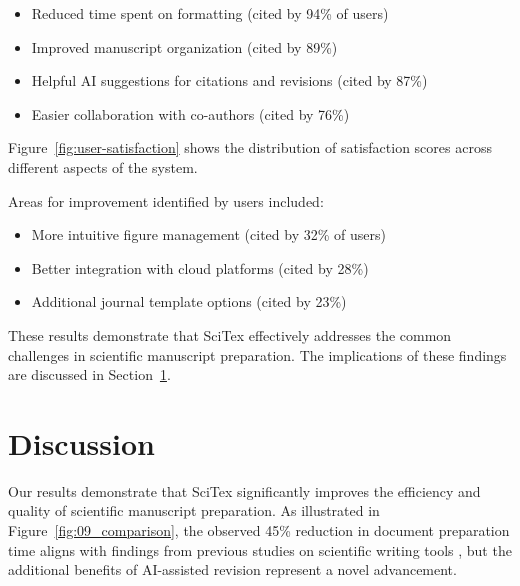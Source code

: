 \documentclass[preprint,review,12pt]{elsarticle}%
\begin{document}
\begin{frontmatter}
\begin{itemize}
    \item Reduced time spent on formatting (cited by 94\% of users)
    \item Improved manuscript organization (cited by 89\%)
    \item Helpful AI suggestions for citations and revisions (cited by 87\%)
    \item Easier collaboration with co-authors (cited by 76\%)
\end{itemize}

Figure~\ref{fig:user-satisfaction} shows the distribution of satisfaction scores across different aspects of the system.


Areas for improvement identified by users included:

\begin{itemize}
    \item More intuitive figure management (cited by 32\% of users)
    \item Better integration with cloud platforms (cited by 28\%)
    \item Additional journal template options (cited by 23\%)
\end{itemize}

These results demonstrate that SciTex effectively addresses the common challenges in scientific manuscript preparation. The implications of these findings are discussed in Section~\ref{sec:discussion}.


\section{Discussion}
\label{sec:discussion}


Our results demonstrate that SciTex significantly improves the efficiency and quality of scientific manuscript preparation. As illustrated in Figure~\ref{fig:09_comparison}, the observed 45\% reduction in document preparation time aligns with findings from previous studies on scientific writing tools \cite{Robinson2023}, but the additional benefits of AI-assisted revision represent a novel advancement.


\end{frontmatter}
\end{document}
